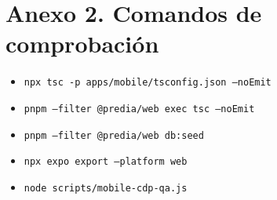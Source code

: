 \documentclass[12pt,letterpaper]{report}
\begin{document}
\section*{Anexo 2. Comandos de comprobación}

\begin{itemize}
  \item \texttt{npx tsc -p apps/mobile/tsconfig.json --noEmit}
  \item \texttt{pnpm --filter @predia/web exec tsc --noEmit}
  \item \texttt{pnpm --filter @predia/web db:seed}
  \item \texttt{npx expo export --platform web}
  \item \texttt{node scripts/mobile-cdp-qa.js}
\end{itemize}
\end{document}
